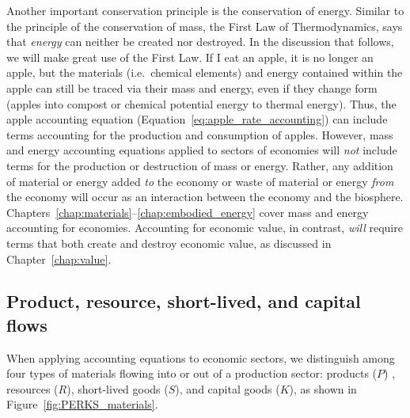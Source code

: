 Another important conservation principle is the conservation of energy.
Similar to the principle of the conservation of mass,
the First Law of Thermodynamics,
says that \emph{energy} can neither be created nor destroyed. 
In the discussion that follows, we will make great use 
of the First Law.
If I eat an apple, it is no longer an apple, 
but the materials (i.e.\ chemical elements) and energy contained
within the apple can still be traced via their mass and energy,
even if they change form (apples into compost or 
chemical potential energy to thermal energy).
Thus, the apple accounting equation
(Equation~\ref{eq:apple_rate_accounting}) can include
terms accounting for the production and consumption of apples. 
However, mass and energy accounting equations applied to 
sectors of economies will \emph{not} include terms for the 
production or destruction of mass or energy. 
Rather, any addition of material or energy added \emph{to} the economy
or waste of material or energy \emph{from} the economy
will occur as an interaction between the economy and the biosphere.
Chapters~\ref{chap:materials}--\ref{chap:embodied_energy} cover mass and energy
accounting for economies.
Accounting for economic value, in contrast, 
\emph{will} require terms that both create and destroy economic value,
as discussed in Chapter~\ref{chap:value}.


\subsection{Product, resource, short-lived, and capital flows}

When applying accounting equations to economic sectors,
we distinguish among four types of
materials flowing into or out of a production sector: 
products ($P$) , 
resources ($R$),
short-lived goods ($S$),
and capital goods ($K$), 
as shown in Figure~\ref{fig:PERKS_materials}.

